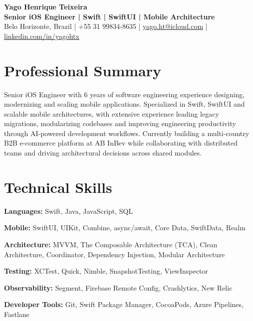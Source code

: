 \documentclass[10pt,a4paper]{article}
\begin{document}
\begin{center}

{\Large\bfseries Yago Henrique Teixeira}\\[4pt]

\textbf{Senior iOS Engineer | Swift | SwiftUI | Mobile Architecture}\\[4pt]

Belo Horizonte, Brazil \quad | \quad +55 31 99834-8635 \quad | \quad
\href{mailto:yago.ht@icloud.com}{yago.ht@icloud.com}
\quad | \quad
\href{https://linkedin.com/in/yagohtx}{linkedin.com/in/yagohtx}

\end{center}


\section{Professional Summary}

Senior iOS Engineer with 6 years of software engineering experience designing, modernizing and scaling mobile applications. Specialized in Swift, SwiftUI and scalable mobile architectures, with extensive experience leading legacy migrations, modularizing codebases and improving engineering productivity through AI-powered development workflows. Currently building a multi-country B2B e-commerce platform at AB InBev while collaborating with distributed teams and driving architectural decisions across shared modules.


\section{Technical Skills}

\textbf{Languages:}
Swift, Java, JavaScript, SQL

\textbf{Mobile:}
SwiftUI, UIKit, Combine, async/await, Core Data, SwiftData, Realm

\textbf{Architecture:}
MVVM, The Composable Architecture (TCA), Clean Architecture, Coordinator, Dependency Injection, Modular Architecture

\textbf{Testing:}
XCTest, Quick, Nimble, SnapshotTesting, ViewInspector

\textbf{Observability:}
Segment, Firebase Remote Config, Crashlytics, New Relic

\textbf{Developer Tools:}
Git, Swift Package Manager, CocoaPods, Azure Pipelines, Fastlane
\end{document}
